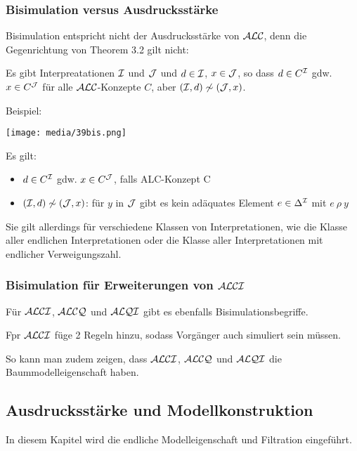 \subsubsection{Bisimulation versus Ausdrucksstärke}\label{bisimulation-versus-ausdrucksstuxe4rke}

Bisimulation entspricht nicht der Ausdrucksstärke von $\mathcal{A}\mathcal{L}\mathcal{C}$, denn die Gegenrichtung von Theorem 3.2 gilt nicht:

Es gibt Interpreatationen $\mathcal{I}$ und $\mathcal{J}$ und $d \in \mathcal{I}$, $x \in \mathcal{J}$, so dass $d \in C^{\mathcal{I}}$ gdw. $x \in C^{\mathcal{J}}$ für alle $\mathcal{A}\mathcal{L}\mathcal{C}$-Konzepte $C$, aber $(\mathcal{I},d) \not\sim (\mathcal{J},x)$. 

Beispiel:

\texttt{[image: media/39bis.png]}

Es gilt:

\begin{itemize}
  \item $d \in C^{\mathcal{I}}$ gdw. $x \in C^{\mathcal{J}}$, falls ALC-Konzept C
  \item $(\mathcal{I},d) \not\sim (\mathcal{J},x)$: für $y$ in $\mathcal{J}$ gibt es kein adäquates Element $e \in \Delta^{\mathcal{I}}$ mit $e\ \rho\ y$
\end{itemize}

Sie gilt allerdings für verschiedene Klassen von Interpretationen, wie die Klasse aller endlichen Interpretationen oder die Klasse aller Interpretationen mit endlicher Verweigungszahl.

\subsubsection{Bisimulation für Erweiterungen von \texorpdfstring{$\mathcal{A}\mathcal{L}\mathcal{C}\mathcal{I}$}{ALCI}}\label{bisimulation-in-alci}

Für $\mathcal{A}\mathcal{L}\mathcal{C}\mathcal{I}$, $\mathcal{A}\mathcal{L}\mathcal{C}\mathcal{Q}$ und $\mathcal{A}\mathcal{L}\mathcal{Q}\mathcal{I}$ gibt es ebenfalls Bisimulationsbegriffe.

Fpr $\mathcal{A}\mathcal{L}\mathcal{C}\mathcal{I}$ füge 2 Regeln hinzu, sodass Vorgänger auch simuliert sein müssen.

So kann man zudem zeigen, dass $\mathcal{A}\mathcal{L}\mathcal{C}\mathcal{I}$, $\mathcal{A}\mathcal{L}\mathcal{C}\mathcal{Q}$ und $\mathcal{A}\mathcal{L}\mathcal{Q}\mathcal{I}$ die Baummodelleigenschaft haben.

\subsection{Ausdrucksstärke und
Modellkonstruktion}\label{ausdrucksstuxe4rke-und-modellkonstruktion}

In diesem Kapitel wird die endliche Modelleigenschaft und Filtration eingeführt.

